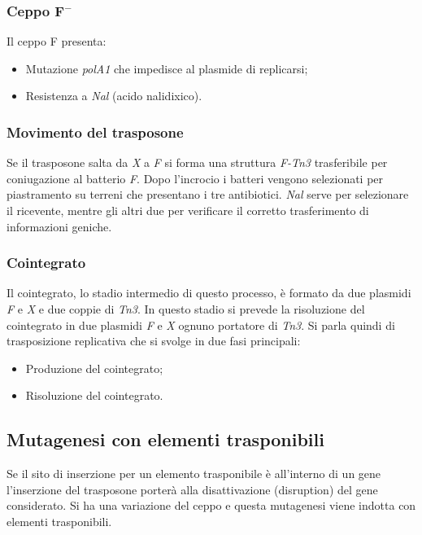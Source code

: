 		\subsubsection{Ceppo \emph{$\mathbf{F^-}$}}
		Il ceppo F\ap{-} presenta:
		\begin{multicols}{2}
			\begin{itemize}
    				\item Mutazione \emph{polA1} che impedisce al plasmide di replicarsi; 
    				\item Resistenza a \emph{Nal} (acido nalidixico).
			\end{itemize}
		\end{multicols}

		\subsubsection{Movimento del trasposone}
		Se il trasposone salta da \emph{X} a \emph{F} si forma una struttura \emph{F-Tn3} trasferibile per coniugazione al batterio \emph{F}. 
		Dopo l'incrocio i batteri vengono selezionati per piastramento su terreni che presentano i tre antibiotici. 
		\emph{Nal} serve per selezionare il ricevente, mentre gli altri due per verificare il corretto trasferimento di informazioni geniche. 

		\subsubsection{Cointegrato}
		Il cointegrato, lo stadio intermedio di questo processo, è formato da due plasmidi \emph{F} e \emph{X} e due coppie di \emph{Tn3}.
		In questo stadio si prevede la risoluzione del cointegrato in due plasmidi \emph{F} e \emph{X} ognuno portatore di \emph{Tn3}.
		Si parla quindi di trasposizione replicativa che si svolge in due fasi principali:
		\begin{multicols}{2}
			\begin{itemize}
    				\item Produzione del cointegrato; 
    				\item Risoluzione del cointegrato.
			\end{itemize}
		\end{multicols}
		
	\subsection{Mutagenesi con elementi trasponibili}
	Se il sito di inserzione per un elemento trasponibile è all'interno di un gene l'inserzione del trasposone porterà alla disattivazione (disruption) del gene considerato. 
	Si ha una variazione del ceppo e questa mutagenesi viene indotta con elementi trasponibili. 

